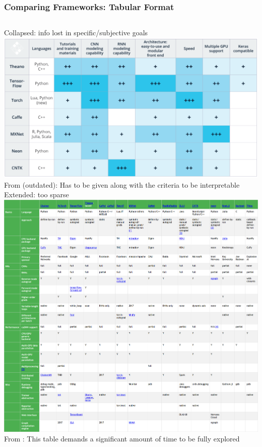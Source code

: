 \documentclass[hyperref={pdfpagelabels=false}]{beamer}
\begin{document}
     \begin{frame}
       \frametitle{Comparing Frameworks: Tabular Format}
       \vspace{6mm}
         \begin{columns}[t]
         \centering
         \small{Collapsed: info lost in specific/subjective goals}
         \includegraphics[scale=0.2]{comparison_svd.png}
         \\\scriptsize{From \cite{svd-review} (outdated): Has to be given along with the criteria to be interpretable}
         \centering
         \small{Extended: too sparse}
         \includegraphics[scale=0.08]{comparison_chainer.png}
         \\\scriptsize{From \cite{chainer-review}: This table demands a significant amount of time to be fully explored}
         \end{columns}
         \vspace{6mm}
     \end{frame}
\end{document}
